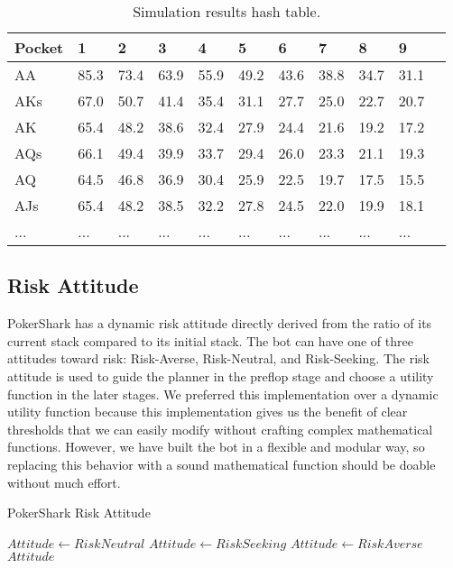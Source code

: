 \begin{table}[H]
    \centering
    \begin{tabular}{|l|l|l|l|l|l|l|l|l|l|l|}
        \hline
        Pocket & 1    & 2    & 3    & 4    & 5    & 6    & 7    & 8    & 9         \\ \hline
        AA     & 85.3 & 73.4 & 63.9 & 55.9 & 49.2 & 43.6 & 38.8 & 34.7 & 31.1      \\ \hline
        AKs    & 67.0 & 50.7 & 41.4 & 35.4 & 31.1 & 27.7 & 25.0 & 22.7 & 20.7      \\ \hline
        AK     & 65.4 & 48.2 & 38.6 & 32.4 & 27.9 & 24.4 & 21.6 & 19.2 & 17.2      \\ \hline
        AQs    & 66.1 & 49.4 & 39.9 & 33.7 & 29.4 & 26.0 & 23.3 & 21.1 & 19.3      \\ \hline
        AQ     & 64.5 & 46.8 & 36.9 & 30.4 & 25.9 & 22.5 & 19.7 & 17.5 & 15.5      \\ \hline
        AJs    & 65.4 & 48.2 & 38.5 & 32.2 & 27.8 & 24.5 & 22.0 & 19.9 & 18.1      \\ \hline
        ...    & ... & ... & ... & ... & ... & ... & ... & ... & ...      \\ \hline
    \end{tabular}
    \caption{Simulation results hash table.}
    \label{tab:hashTable}
\end{table}

\subsection{Risk Attitude}
PokerShark has a dynamic risk attitude directly derived from the ratio of its current stack compared to its initial stack. The bot can have one of three attitudes toward risk: Risk-Averse, Risk-Neutral, and Risk-Seeking. The risk attitude is used to guide the planner in the preflop stage and choose a utility function in the later stages. We preferred this implementation over a dynamic utility function because this implementation gives us the benefit of clear thresholds that we can easily modify without crafting complex mathematical functions. However, we have built the bot in a flexible and modular way, so replacing this behavior with a sound mathematical function should be doable without much effort. 

\begin{Algorithmus}[H]
    \caption{PokerShark Risk Attitude}
    \label{alg:sample}
    \begin{algorithmic}
        \State $Attitude \gets RiskNeutral$
            \State $Attitude \gets RiskSeeking$
            \State $Attitude \gets RiskAverse$ 
        \EndIf
            \State \Return $Attitude$
        \EndProcedure
    \end{algorithmic}
\end{Algorithmus}

